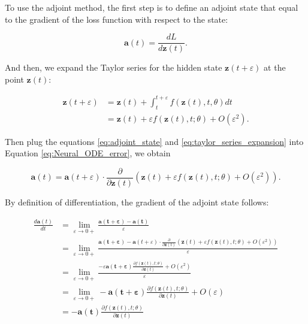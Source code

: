 \documentclass[
	parskip, 			   %
	twoside, 			   %
	DIV=14, 			   %
	BCOR=15.0mm, 		   %
	headsepline, 		   %
	open=right, 		   %
	captions=tableheading, %
	bibliography=totoc,    %
	numbers=noenddot       %
]{scrreprt}
\begin{document}
To use the adjoint method, the first step is to define an adjoint state that equal to the gradient of the loss function with respect to the state:

\begin{equation}
    \label{eq:adjoint_state}
    \mathbf{a}(t) = \frac{d L}{d\mathbf{z}(t)}.
\end{equation}

And then, we expand the Taylor series for the hidden state $\mathbf{z}(t+\varepsilon )$ at the point $\mathbf{z}(t)$:

\begin{equation}
    \label{eq:taylor_series_expansion}
    \begin{aligned}
    \mathbf{z}(t+\varepsilon ) &= \mathbf{z}(t) + \int_{t}^{t+\varepsilon } f(\mathbf{z}(t), t, \theta)dt\\
    &= \mathbf{z}(t) + \varepsilon f(\mathbf{z}(t), t; \theta) + O (\varepsilon ^2).
    \end{aligned}
\end{equation}

Then plug the equations \ref{eq:adjoint_state} and \ref{eq:taylor_series_expansion} into Equation \ref{eq:Neural_ODE_error}, we obtain

\begin{equation}
    \label{eq:Neural_ODE_adjoint_state}
    \mathbf{a}(t) = \mathbf{a}(t+\varepsilon ) \cdot \frac{\partial}{\partial \mathbf{z}(t)} (\mathbf{z}(t) + \varepsilon f(\mathbf{z}(t), t; \theta) + O (\varepsilon ^2)) .
\end{equation}

By definition of differentiation, the gradient of the adjoint state follows:

\begin{equation}
    \label{eq:adjoint_state_gradient_hidden_state}
    \begin{aligned}
        \frac{d\mathbf{a}(t)}{dt} &= \lim_{\varepsilon \to 0+} \frac{\mathbf{a(t+\varepsilon)}-\mathbf{a(t)}}{\varepsilon} \\
        &= \lim_{\varepsilon \to 0+} \frac{\mathbf{a(t+\varepsilon)}-\mathbf{a}(t+\varepsilon ) \cdot \frac{\partial}{\partial \mathbf{z}(t)} (\mathbf{z}(t) + \varepsilon f(\mathbf{z}(t), t; \theta) + O (\varepsilon ^2)) }{\varepsilon}\\
        &= \lim_{\varepsilon \to 0+} \frac{-\varepsilon \mathbf{a(t+\varepsilon)} \frac{\partial f(\mathbf{z}(t), t; \theta)}{\partial \mathbf{z}(t)} + O (\varepsilon ^2)}{\varepsilon}\\
        &= \lim_{\varepsilon \to 0+} - \mathbf{a(t+\varepsilon)} \frac{\partial f(\mathbf{z}(t), t; \theta)}{\partial \mathbf{z}(t)} + O (\varepsilon)\\
        &= - \mathbf{a(t)} \frac{\partial f(\mathbf{z}(t), t; \theta)}{\partial \mathbf{z}(t)}
    \end{aligned}
\end{equation}
\end{document}
